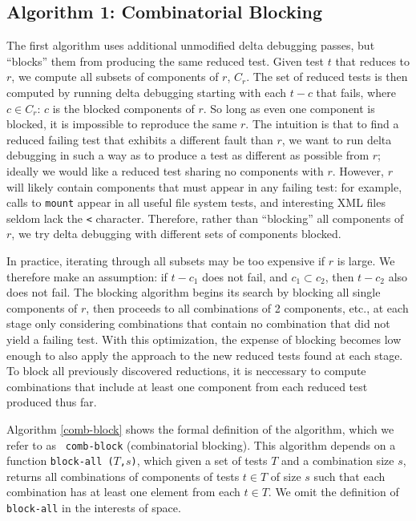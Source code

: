 

\subsection{Algorithm 1:  Combinatorial Blocking}

The first algorithm uses additional unmodified delta debugging passes, but
``blocks'' them from producing the same reduced test.  Given test $t$
that reduces to $r$, we compute all subsets of components of $r$,
$C_r$.  The set of reduced tests is then computed by running delta
debugging starting with each $t-c$ that fails, where $c \in C_r$: $c$
is the blocked components of $r$.  So long as even one component is
blocked, it is impossible to reproduce the same $r$.  The intuition
is that to find a reduced failing test that exhibits a different fault
than $r$, we want to run delta debugging in such a way as to produce a
test as different as possible from $r$; ideally we would like a
reduced test sharing no components with $r$.  However, $r$ will likely contain
components that must appear in any failing test:  for example,
calls to {\tt mount} appear in all useful file system tests,
and interesting XML files seldom lack the {\tt <} character.
Therefore, rather than ``blocking'' all components of $r$, we try
delta debugging with different sets of components blocked.

In practice, iterating through all subsets may be too expensive if $r$
is large.  We therefore make an assumption:  if $t-c_1$ does not fail,
and $c_1 \subset c_2$, then $t-c_2$ also does not fail.  The blocking
algorithm begins its search by blocking all single components of $r$,
then proceeds to all combinations of 2 components, etc., at each stage
only considering combinations that contain no combination that did not
yield a failing test.  With this optimization, the expense of blocking
becomes low enough to also apply the approach to the new
reduced tests found at each stage.  To block all previously discovered
reductions, it is neccessary to compute combinations that include at
least one component from each reduced test produced thus far.

 Algorithm \ref{comb-block} shows
the formal definition of the algorithm, which we refer to as {\tt
  comb-block} (combinatorial blocking).  This algorithm depends on a
function {\tt block-all ($T$,$s$)}, which given a set of tests $T$ and
a combination size $s$,  returns all combinations of components of tests $t
\in T$ of size $s$ such that each combination has at least one element
from each $t \in T$.  We omit the definition of {\tt block-all} in
the interests of space.

